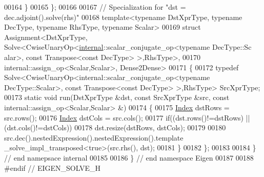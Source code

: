 \begin{DoxyCode}
00164   \}
00165 \};
00166 
00167 \textcolor{comment}{// Specialization for "dst = dec.adjoint().solve(rhs)"}
00168 \textcolor{keyword}{template}<\textcolor{keyword}{typename} DstXprType, \textcolor{keyword}{typename} DecType, \textcolor{keyword}{typename} RhsType, \textcolor{keyword}{typename} Scalar>
00169 \textcolor{keyword}{struct }Assignment<DstXprType, Solve<CwiseUnaryOp<\hyperlink{namespaceinternal}{internal}::scalar\_conjugate\_op<typename DecType::Sc
      alar>, const Transpose<const DecType> >,RhsType>,
00170                   internal::assign\_op<Scalar,Scalar>, Dense2Dense>
00171 \{
00172   \textcolor{keyword}{typedef} Solve<CwiseUnaryOp<internal::scalar\_conjugate\_op<typename DecType::Scalar>, \textcolor{keyword}{const} Transpose<const
       DecType> >,RhsType> SrcXprType;
00173   \textcolor{keyword}{static} \textcolor{keywordtype}{void} run(DstXprType &dst, \textcolor{keyword}{const} SrcXprType &src, \textcolor{keyword}{const} internal::assign\_op<Scalar,Scalar> &)
00174   \{
00175     \hyperlink{namespace_eigen_a62e77e0933482dafde8fe197d9a2cfde}{Index} dstRows = src.rows();
00176     \hyperlink{namespace_eigen_a62e77e0933482dafde8fe197d9a2cfde}{Index} dstCols = src.cols();
00177     \textcolor{keywordflow}{if}((dst.rows()!=dstRows) || (dst.cols()!=dstCols))
00178       dst.resize(dstRows, dstCols);
00179     
00180     src.dec().nestedExpression().nestedExpression().template \_solve\_impl\_transposed<true>(src.rhs(), dst);
00181   \}
00182 \};
00183 
00184 \} \textcolor{comment}{// end namepsace internal}
00185 
00186 \} \textcolor{comment}{// end namespace Eigen}
00187 
00188 \textcolor{preprocessor}{#endif // EIGEN\_SOLVE\_H}
\end{DoxyCode}
